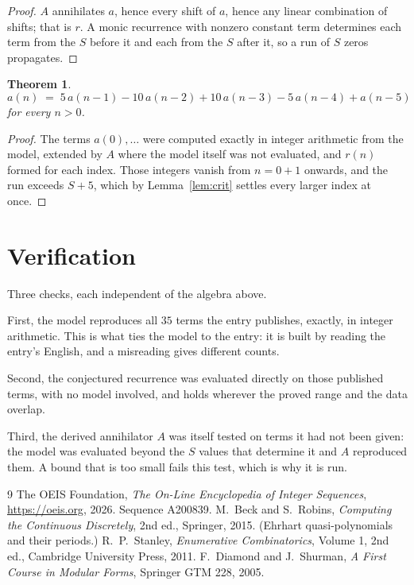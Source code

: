 \documentclass[11pt,a4paper]{article}
\theoremstyle{plain}
\newtheorem{theorem}{Theorem}
\theoremstyle{definition}
\begin{document}
\begin{proof}
$A$ annihilates $a$, hence every shift of $a$, hence any linear combination of shifts; that is
$r$. A monic recurrence with nonzero constant term determines each term from the $S$ before it
and each from the $S$ after it, so a run of $S$ zeros propagates.
\end{proof}

\begin{theorem}
\[
a(n)\;=\;5\,a(n-1) - 10\,a(n-2) + 10\,a(n-3) - 5\,a(n-4) + a(n-5)
\]
for every $n>0$.
\end{theorem}

\begin{proof}
The terms $a(0),\dots$ were computed exactly in integer arithmetic from the model, extended by
$A$ where the model itself was not evaluated, and $r(n)$ formed for each index. Those integers
vanish from $n=0+1$ onwards, and the run exceeds $S+5$, which by
Lemma~\ref{lem:crit} settles every larger index at once.
\end{proof}

\section{Verification}

Three checks, each independent of the algebra above.

First, the model reproduces all $35$ terms the entry publishes, exactly, in integer
arithmetic. This is what ties the model to the entry: it is built by reading the entry's
English, and a misreading gives different counts.

Second, the conjectured recurrence was evaluated directly on those published terms, with no
model involved, and holds wherever the proved range and the data overlap.

Third, the derived annihilator $A$ was itself tested on terms it had not been given: the model
was evaluated beyond the $S$ values that determine it and $A$ reproduced them. A bound that is
too small fails this test, which is why it is run.

\begin{thebibliography}{9}
 The OEIS Foundation, \emph{The On-Line Encyclopedia of Integer
Sequences}, \url{https://oeis.org}, 2026. Sequence A200839.
 M.~Beck and S.~Robins, \emph{Computing the Continuous Discretely},
2nd ed., Springer, 2015. (Ehrhart quasi-polynomials and their periods.)
 R.~P.~Stanley, \emph{Enumerative Combinatorics}, Volume 1, 2nd ed.,
Cambridge University Press, 2011.
 F.~Diamond and J.~Shurman, \emph{A First Course in Modular Forms},
Springer GTM 228, 2005.
\end{thebibliography}
\end{document}

